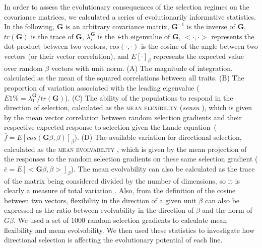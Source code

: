 \begin{refsection}
In order to assess the evolutionary consequences of the selection
regimes on the covariance matrices, we calculated a series of
evolutionarily informative statistics. In the following, \(\mathbf{G}\)
is an arbitrary covariance matrix, \(\mathbf{G}^{-1}\) is the inverse of
\(\mathbf{G}\), \(tr(\mathbf{G})\) is the trace of \(\mathbf{G}\),
\(\lambda_i^\mathbf{G}\) is the \emph{i}-th eigenvalue of
\(\mathbf{G}\), \(<\cdot, \cdot>\) represents the dot-product between
two vectors, \(cos(\cdot, \cdot)\) is the cosine of the angle between
two vectors (or their vector correlation), and \(E[\cdot]_\beta\)
represents the expected value over random \(\beta\) vectors with unit
norm. (A) The magnitude of integration, calculated as the mean of the
squared correlations between all traits. (B) The proportion of variation
associated with the leading eigenvalue
(\(E1\% = \lambda_1^{\mathbf{G}} / tr(\mathbf{G})\)). (C) The ability of
the populations to respond in the direction of selection, calculated as
the \textsc{mean flexibility} (\emph{sensu} \textcite{Marroig2009-gf}), which is
given by the mean vector correlation between random selection gradients
and their respective expected response to selection given the Lande
equation~(\(\bar{f} = E[cos(\mathbf{G}\beta,\beta)]_\beta\)). (D) The
available variation for directional selection, calculated as the
\textsc{mean evolvability} \parencite{Hansen2008-kz}, which is given by the mean
projection of the responses to the random selection gradients on these
same selection gradient
(\(\bar{e} = E[<\mathbf{G}\beta,\beta>]_\beta\)). The mean evolvability
can also be calculated as the trace of the matrix being considered
divided by the number of dimensions, so it is clearly a measure of total
variation \parencite{Hansen2008-kz}. Also, from the definition of the cosine
between two vectors, flexibility in the direction of a given unit
\(\beta\) can also be expressed as the ratio between evolvability in the
direction of \(\beta\) and the norm of \(G\beta\). We used a set of
\(1000\) random selection gradients to calculate mean flexibility and
mean evolvability. We then used these statistics to investigate how
directional selection is affecting the evolutionary potential of each
line.


\end{refsection}
